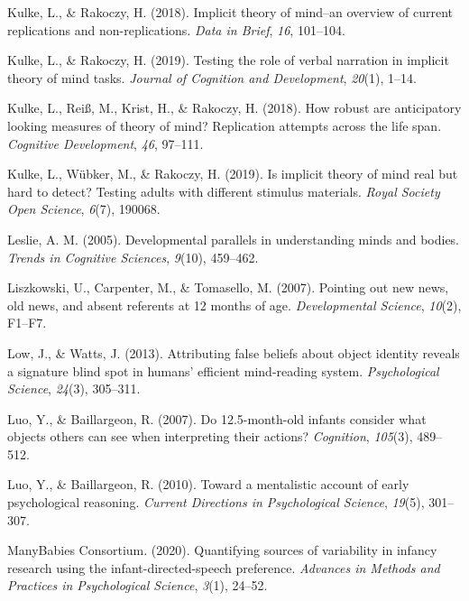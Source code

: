 \documentclass[
  english,
  man,floatsintext]{apa6}
\newlength{\cslhangindent}
\newlength{\cslentryspacingunit} %
\newenvironment{CSLReferences}[2] %
 {%
  \setlength{\parindent}{0pt}
  \ifodd #1
  \let\oldpar\par
  \def\par{\hangindent=\cslhangindent\oldpar}
  \fi
  \setlength{\parskip}{#2\cslentryspacingunit}
 }%
 {}
\begin{document}
\begin{CSLReferences}{1}{0}
\leavevmode{}%
Kulke, L., \& Rakoczy, H. (2018). Implicit theory of mind--an overview of current replications and non-replications. \emph{Data in Brief}, \emph{16}, 101--104.

\leavevmode{}%
Kulke, L., \& Rakoczy, H. (2019). Testing the role of verbal narration in implicit theory of mind tasks. \emph{Journal of Cognition and Development}, \emph{20}(1), 1--14.

\leavevmode{}%
Kulke, L., Reiß, M., Krist, H., \& Rakoczy, H. (2018). How robust are anticipatory looking measures of theory of mind? Replication attempts across the life span. \emph{Cognitive Development}, \emph{46}, 97--111.

\leavevmode{}%
Kulke, L., Wübker, M., \& Rakoczy, H. (2019). Is implicit theory of mind real but hard to detect? Testing adults with different stimulus materials. \emph{Royal Society Open Science}, \emph{6}(7), 190068.

\leavevmode{}%
Leslie, A. M. (2005). Developmental parallels in understanding minds and bodies. \emph{Trends in Cognitive Sciences}, \emph{9}(10), 459--462.

\leavevmode{}%
Liszkowski, U., Carpenter, M., \& Tomasello, M. (2007). Pointing out new news, old news, and absent referents at 12 months of age. \emph{Developmental Science}, \emph{10}(2), F1--F7.

\leavevmode{}%
Low, J., \& Watts, J. (2013). Attributing false beliefs about object identity reveals a signature blind spot in humans' efficient mind-reading system. \emph{Psychological Science}, \emph{24}(3), 305--311.

\leavevmode{}%
Luo, Y., \& Baillargeon, R. (2007). Do 12.5-month-old infants consider what objects others can see when interpreting their actions? \emph{Cognition}, \emph{105}(3), 489--512.

\leavevmode{}%
Luo, Y., \& Baillargeon, R. (2010). Toward a mentalistic account of early psychological reasoning. \emph{Current Directions in Psychological Science}, \emph{19}(5), 301--307.

\leavevmode{}%
ManyBabies Consortium. (2020). Quantifying sources of variability in infancy research using the infant-directed-speech preference. \emph{Advances in Methods and Practices in Psychological Science}, \emph{3}(1), 24--52.


\end{CSLReferences}
\end{document}
